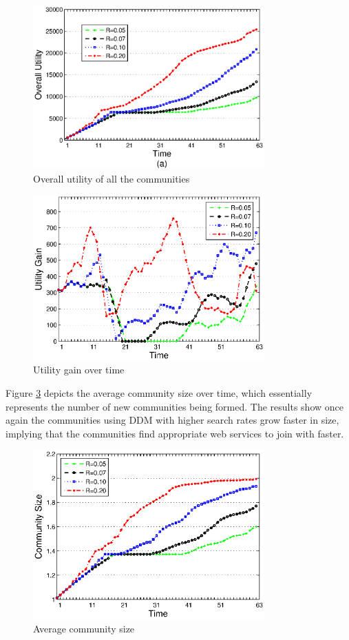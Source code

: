 {\begin{figure}%
\centering
\includegraphics[width=3.5in]{figures/stats1.eps}
\caption{Overall utility of all the communities}
\label{stats1}
\end{figure}


\begin{figure}%
\centering
\includegraphics[width=3.5in]{figures/stats2.eps}
\caption{Utility gain over time}
\label{stats2}
\end{figure}

Figure \ref{stats3} depicts the average community size over time, which essentially represents the number of new communities being formed. The results show once again the communities using DDM with higher search rates grow faster in size, implying that the communities find appropriate web services to join with faster.

\begin{figure}%
\centering
\includegraphics[width=3.5in]{figures/stats3.eps}
\caption{Average community size}
\label{stats3}
\end{figure}



}

